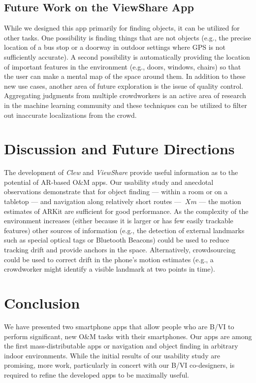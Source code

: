 \documentclass[chi_draft]{sigchi}
\newcommand{\BVI}{B/VI\xspace}
\newcommand{\OM}{O\&M\xspace}
\begin{document}
\subsection{Future Work on the ViewShare App}
While we designed this app primarily for finding objects, it can be utilized for other tasks.  One possibility is finding things that are not objects (e.g., the precise location of a bus stop or a doorway in outdoor settings where GPS is not sufficiently accurate).  A second possibility is automatically providing the location of important features in the environment (e.g., doors, windows, chairs) so that the user can make a mental map of the space around them.  In addition to these new use cases, another area of future exploration is the issue of quality control.  Aggregating judgments from multiple crowdworkers is an active area of research in the machine learning community and these techniques can be utilized to filter out inaccurate localizations from the crowd.

\section{Discussion and Future Directions}

The development of \emph{Clew} and \emph{ViewShare} provide useful information as to the potential of AR-based \OM apps.  Our usability study and anecdotal observations demonstrate that for object finding --- within a room or on a tabletop --- and navigation along relatively short routes --- $~Xm$ --- the motion estimates of ARKit are sufficient for good performance.  As the complexity of the environment increases (either because it is larger or has few easily trackable features) other sources of information (e.g., the detection of external landmarks such as special optical tags or Bluetooth Beacons) could be used to reduce tracking drift and provide anchors in the space.  Alternatively, crowdsourcing could be used to correct drift in the phone's motion estimates (e.g., a crowdworker might identify a visible landmark at two points in time).

\balance{}

\section{Conclusion}
We have presented two smartphone apps that allow people who are \BVI to perform significant, new \OM tasks with their smartphones.  Our apps are among the first mass-distributable apps or navigation and object finding in arbitrary indoor environments.  While the initial results of our usability study are promising, more work, particularly in concert with our \BVI co-designers, is required to refine the developed apps to be maximally useful.
\end{document}
